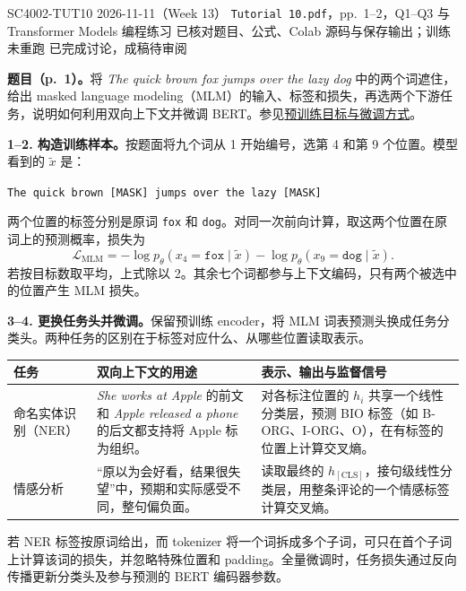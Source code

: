 \begingroup
\linespread{1.15}\selectfont
\setlength{\parskip}{0.4em}
\renewcommand{\recordid}[1]{}
\renewcommand{\relatedtopic}[2]{\hyperref[topic:#1]{#2}}
\label{tutorial:SC4002-TUT10}

\tutorialmeta
  {SC4002-TUT10}
  {2026-11-11（Week 13）}
  {\texttt{Tutorial 10.pdf}，pp.~1--2，Q1--Q3 与 Transformer Models 编程练习}
  {已核对题目、公式、Colab 源码与保存输出；训练未重跑}
  {已完成讨论，成稿待审阅}

\nopagebreak[4]
\textbf{题目（p.~1）。}将 \textit{The quick brown fox jumps over the lazy dog} 中的两个词遮住，给出 masked language modeling（MLM）的输入、标签和损失，再选两个下游任务，说明如何利用双向上下文并微调 BERT。参见\relatedtopic{SC4002-L12-T03}{预训练目标与微调方式}。

\textbf{1--2. 构造训练样本。}按题面将九个词从 1 开始编号，选第 4 和第 9 个位置。模型看到的 $\tilde{x}$ 是：
\begin{center}
  \texttt{The quick brown [MASK] jumps over the lazy [MASK]}
\end{center}
两个位置的标签分别是原词 \texttt{fox} 和 \texttt{dog}。对同一次前向计算，取这两个位置在原词上的预测概率，损失为
\[
  \mathcal L_{\mathrm{MLM}}
  =-\log p_\theta(x_4=\texttt{fox}\mid\tilde{x})
   -\log p_\theta(x_9=\texttt{dog}\mid\tilde{x}).
\]
若按目标数取平均，上式除以 2。其余七个词都参与上下文编码，只有两个被选中的位置产生 MLM 损失。

\textbf{3--4. 更换任务头并微调。}保留预训练 encoder，将 MLM 词表预测头换成任务分类头。两种任务的区别在于标签对应什么、从哪些位置读取表示。
\begin{center}
\small
\begin{tabularx}{\linewidth}{@{}lXX@{}}
\toprule
任务 & 双向上下文的用途 & 表示、输出与监督信号 \\
\midrule
命名实体识别（NER） & \textit{She works at Apple} 的前文和 \textit{Apple released a phone} 的后文都支持将 Apple 标为组织。 & 对各标注位置的 $h_i$ 共享一个线性分类层，预测 BIO 标签（如 B-ORG、I-ORG、O），在有标签的位置上计算交叉熵。\\
情感分析 & “原以为会好看，结果很失望”中，预期和实际感受不同，整句偏负面。 & 读取最终的 $h_{\mathrm{[CLS]}}$，接句级线性分类层，用整条评论的一个情感标签计算交叉熵。\\
\bottomrule
\end{tabularx}
\end{center}
若 NER 标签按原词给出，而 tokenizer 将一个词拆成多个子词，可只在首个子词上计算该词的损失，并忽略特殊位置和 padding。全量微调时，任务损失通过反向传播更新分类头及参与预测的 BERT 编码器参数。

